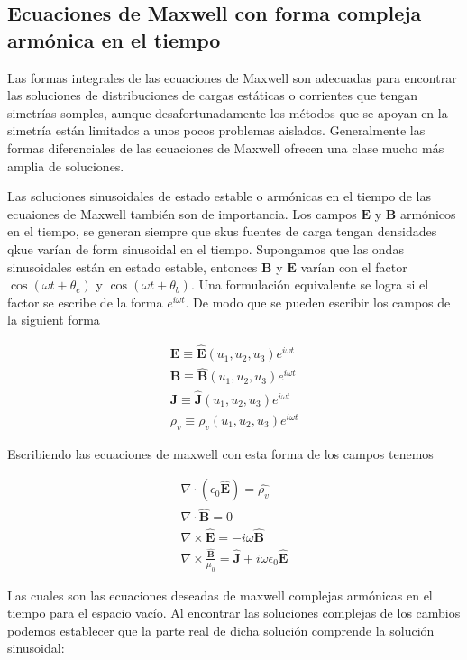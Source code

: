 \subsection{Ecuaciones de Maxwell con forma compleja armónica en el tiempo}

Las formas integrales de las ecuaciones de Maxwell son adecuadas para encontrar las soluciones de distribuciones de cargas estáticas o corrientes que tengan simetrías somples, aunque desafortunadamente los métodos que se apoyan en la simetría están limitados a unos pocos problemas aislados. Generalmente las formas diferenciales de las ecuaciones de Maxwell ofrecen una clase mucho más amplia de soluciones.

Las soluciones sinusoidales de estado estable o armónicas en el tiempo de las ecuaiones de Maxwell también son de importancia. Los campos $\mathbf{E}$ y $\mathbf{B}$ armónicos en el tiempo, se generan siempre que skus fuentes de carga tengan densidades qkue varían de form sinusoidal en el tiempo. Supongamos que las ondas sinusoidales están en estado estable, entonces $\mathbf{B}$ y $\mathbf{E}$ varían con el factor $\cos (\omega t  + \theta_e)$ y $\cos (\omega t  + \theta_b)$. Una formulación equivalente se logra si el factor se escribe de la forma $e^{i \omega t}$. De modo que se pueden escribir los campos de la siguient forma

\begin{eqnarray*}
\mathbf{E} \equiv \mathbf{\hat{E}} (u_1,u_2,u_3) e^{i \omega t} \\
\mathbf{B} \equiv \mathbf{\hat{B}} (u_1,u_2,u_3) e^{i \omega t} \\
\mathbf{J} \equiv \mathbf{\hat{J}} (u_1,u_2,u_3) e^{i \omega t} \\
\rho_v \equiv \rho_v (u_1,u_2,u_3) e^{i \omega t} 
\end{eqnarray*}

Escribiendo las ecuaciones de maxwell con esta forma de los campos tenemos

\begin{eqnarray*}
\nabla \cdot (\epsilon_0 \mathbf{\hat{E}}) = \hat{\rho_v} \\
\nabla \cdot \mathbf{\hat{B}} = 0  \\
\nabla \times \mathbf{\hat{E}} = - i \omega \mathbf{\hat{B}} \\
\nabla \times \frac{\mathbf{\hat{B}}}{\mu_0} = \mathbf{\hat{J}} + i \omega \epsilon_0 \mathbf{\hat{E}}
\end{eqnarray*}

Las cuales son las ecuaciones deseadas de maxwell complejas armónicas en el tiempo para el espacio vacío. Al encontrar las soluciones complejas de los cambios podemos establecer que la parte real de dicha solución comprende la solución sinusoidal:

